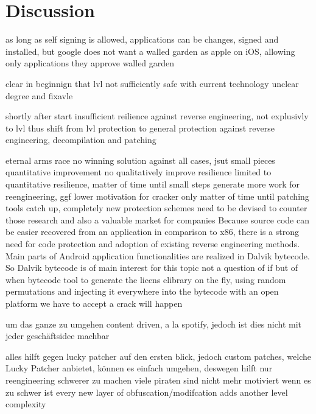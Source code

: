 \section{Discussion} \label{section:conclusion-discussion}

as long as self signing is allowed, applications can be changes, signed and installed, but google does not want a walled garden as apple on iOS, allowing only applications they approve\cite{codeSigning} \cite{androidSigning} walled garden


clear in beginnign that lvl not sufficiently safe with current technology
unclear degree and fixavle

shortly after start insufficient reilience against reverse engineering, not explusivly to lvl
thus shift from lvl protection to general protection against reverse engineering, decompilation and patching

eternal arms race
no winning solution against all cases, jsut small pieces quantitative improvement
no qualitatively improve resilience
limited to quantitative resilience, matter of time until small steps
generate more work for reengineering, ggf lower motivation for cracker
only matter of time until patching tools catch up, completely new protection schemes need to be devised to counter those
\cite{munteanLicense}
%
research and also a valuable market for companies\newline
Because source code can be easier recovered from an application in comparison
to x86, there is a strong need for code protection and adoption of existing reverse engineering methods. Main parts of Android application functionalities are realized in Dalvik bytecode. So Dalvik bytecode is of main interest for this topic
\cite{schulzLabCourse}
%
not a question of if but of when
bytecode tool to generate the licens elibrary on the fly, using random  permutations and injecting it everywhere into the bytecode
with an open platform we have to accept a crack will happen
\cite{digipomLvl}
%


um das ganze zu umgehen content driven, a la spotify, jedoch ist dies nicht mit jeder geschäftsidee machbar

alles hilft gegen lucky patcher auf den ersten blick, jedoch custom patches, welche Lucky Patcher anbietet\cite{munteanLicense}, können es einfach umgehen,
deswegen hilft nur reengineering schwerer zu machen
viele piraten sind nicht mehr motiviert wenn es zu schwer ist\newline
every new layer of obfuscation/modifcation adds another level complexity\newline


